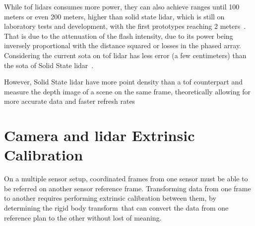 While \ac{tof} \acp{lidar} consumes more power, they can also achieve ranges until 100 meters \cite{vlp16, Sullivan2016} or even 200 meters\cite{VelodyneHDL64, Sullivan2016}, higher than solid state \ac{lidar}, which is still on laboratory tests and development, with the first prototypes reaching 2 meters~\cite{Hecht2018}. That is due to the attenuation of the flash intensity, due to its power being inversely proportional with the distance squared or losses in the phased array. Considering the current \ac{sota} on \ac{tof} \ac{lidar} has less error (a few centimeters) than the \ac{sota} of Solid State \ac{lidar}~\cite{Hecht2018, Fersch2017a}.

However, Solid State \ac{lidar} have more point density than a \ac{tof} counterpart and measure the depth image of a scene on the same frame, theoretically allowing for more accurate data and faster refresh rates\cite{Sullivan2016, Hecht2018, Fersch2017a}






\section{Camera and \ac{lidar} Extrinsic Calibration}
\label{sec:sota:extrinsic_calibration}

On a multiple sensor setup, coordinated frames from one sensor must be able to be referred on another sensor reference frame. Transforming data from one frame to another requires performing extrinsic calibration between them, by determining the rigid body transform~\citeneeded that can convert the data from one reference plan to the other without lost of meaning. 

